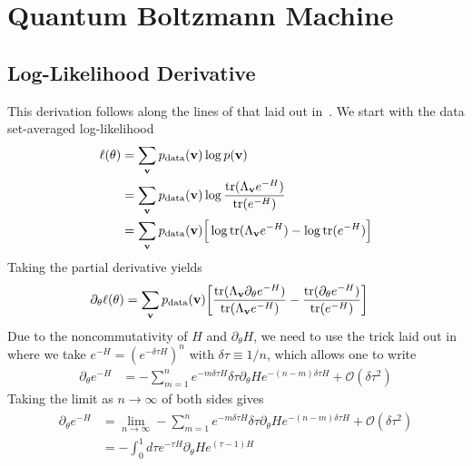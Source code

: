 \section{Quantum Boltzmann Machine}
\subsection{Log-Likelihood Derivative}\label{app:qbm_log_likelihood_derivation}
This derivation follows along the lines of that laid out in~\cite{amin_2018}.
We start with the data set-averaged log-likelihood
\begin{align}
\begin{split}
    \ell(\theta)
        &= \sum_{\mathbf{v}} p_{\text{data}}(\mathbf{v}) \log p(\mathbf{v}) \\
        &= \sum_{\mathbf{v}} p_{\text{data}}(\mathbf{v}) \log \frac{\text{tr}(\Lambda_{\mathbf{v}} e^{-H})}{\text{tr}(e^{-H})} \\
        &= \sum_{\mathbf{v}} p_{\text{data}}(\mathbf{v}) \Big[ \log\text{tr}(\Lambda_{\mathbf{v}} e^{-H}) - \log\text{tr}(e^{-H}) \Big]
\end{split}
\end{align}
Taking the partial derivative yields
\begin{align}
    \label{eq:qbm_log_likelihood_derivative}
    \partial_\theta \ell(\theta)
        &= \sum_{\mathbf{v}} p_{\text{data}}(\mathbf{v}) \bigg[ \frac{\text{tr}(\Lambda_{\mathbf{v}} \partial_\theta e^{-H})}{\text{tr}(\Lambda_{\mathbf{v}} e^{-H})} - \frac{\text{tr}(\partial_\theta e^{-H})}{\text{tr}(e^{-H})} \bigg]
\end{align}
Due to the noncommutativity of \( H \) and \( \partial_\theta H \), we need to use the trick laid out in~\cite{amin_2018} where we take \( e^{-H} = (e^{-\delta\tau H})^n \) with \( \delta\tau \equiv 1 / n \), which allows one to write
\begin{align}
    \partial_\theta e^{-H}
        &= -\sum_{m=1}^{n} e^{-m\delta\tau H} \delta\tau \partial_\theta He^{-(n-m)\delta\tau H} + \mathcal{O}(\delta\tau^2)
\end{align}
Taking the limit as \( n \rightarrow \infty \) of both sides gives
\begin{align}
\begin{split}
    \partial_\theta e^{-H}
        &= \lim_{n\rightarrow\infty} -\sum_{m=1}^{n} e^{-m\delta\tau H} \delta\tau \partial_\theta He^{-(n-m)\delta\tau H} + \mathcal{O}(\delta\tau^2) \\
        &= -\int_{0}^{1} d\tau e^{-\tau H} \partial_\theta H e^{(\tau-1)H}
\end{split}
\end{align}
